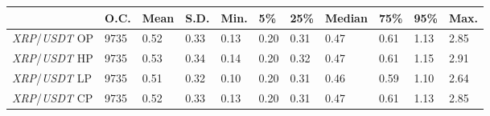 \begin{tabular}{lllllllllll}
\toprule
 & \textbf{O.C.} & \textbf{Mean} & \textbf{S.D.} & \textbf{Min.} & \textbf{5\%} & \textbf{25\%} & \textbf{Median} & \textbf{75\%} & \textbf{95\%} & \textbf{Max.} \\
\midrule
\emph{XRP}/\emph{USDT} OP & 9735 & 0.52 & 0.33 & 0.13 & 0.20 & 0.31 & 0.47 & 0.61 & 1.13 & 2.85 \\
\emph{XRP}/\emph{USDT} HP & 9735 & 0.53 & 0.34 & 0.14 & 0.20 & 0.32 & 0.47 & 0.61 & 1.15 & 2.91 \\
\emph{XRP}/\emph{USDT} LP & 9735 & 0.51 & 0.32 & 0.10 & 0.20 & 0.31 & 0.46 & 0.59 & 1.10 & 2.64 \\
\emph{XRP}/\emph{USDT} CP & 9735 & 0.52 & 0.33 & 0.13 & 0.20 & 0.31 & 0.47 & 0.61 & 1.13 & 2.85 \\
\bottomrule
\end{tabular}
